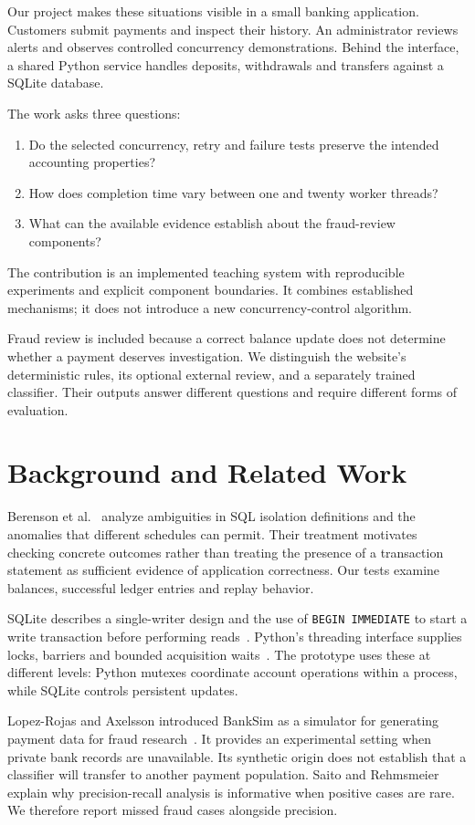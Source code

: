 \documentclass[conference]{IEEEtran}
\begin{document}
Our project makes these situations visible in a small banking application. Customers submit payments and inspect their history. An administrator reviews alerts and observes controlled concurrency demonstrations. Behind the interface, a shared Python service handles deposits, withdrawals and transfers against a SQLite database.

The work asks three questions:
\begin{enumerate}
\item Do the selected concurrency, retry and failure tests preserve the intended accounting properties?
\item How does completion time vary between one and twenty worker threads?
\item What can the available evidence establish about the fraud-review components?
\end{enumerate}
The contribution is an implemented teaching system with reproducible experiments and explicit component boundaries. It combines established mechanisms; it does not introduce a new concurrency-control algorithm.

Fraud review is included because a correct balance update does not determine whether a payment deserves investigation. We distinguish the website's deterministic rules, its optional external review, and a separately trained classifier. Their outputs answer different questions and require different forms of evaluation.

\section{Background and Related Work}
Berenson et al.~\cite{berenson} analyze ambiguities in SQL isolation definitions and the anomalies that different schedules can permit. Their treatment motivates checking concrete outcomes rather than treating the presence of a transaction statement as sufficient evidence of application correctness. Our tests examine balances, successful ledger entries and replay behavior.

SQLite describes a single-writer design and the use of \texttt{BEGIN IMMEDIATE} to start a write transaction before performing reads~\cite{sqlite}. Python's threading interface supplies locks, barriers and bounded acquisition waits~\cite{threading}. The prototype uses these at different levels: Python mutexes coordinate account operations within a process, while SQLite controls persistent updates.

Lopez-Rojas and Axelsson introduced BankSim as a simulator for generating payment data for fraud research~\cite{banksim}. It provides an experimental setting when private bank records are unavailable. Its synthetic origin does not establish that a classifier will transfer to another payment population. Saito and Rehmsmeier~\cite{saito} explain why precision-recall analysis is informative when positive cases are rare. We therefore report missed fraud cases alongside precision.
\end{document}
